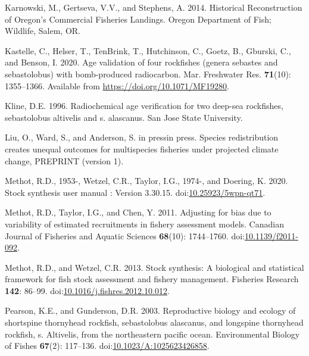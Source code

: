 \documentclass[11pt,
  english,
  letterpaper,
]{article}
\newlength{\cslhangindent}
\newenvironment{CSLReferences}[2] %
 {%
  \setlength{\parindent}{0pt}
  \ifodd #1 \everypar{\setlength{\hangindent}{\cslhangindent}}\ignorespaces\fi
  \ifnum #2 > 0
  \setlength{\parskip}{#2\baselineskip}
  \fi
 }%
 {}
\begin{document}
\begin{CSLReferences}{1}{0}
\leavevmode{}%
Karnowski, M., Gertseva, V.V., and Stephens, A. 2014. Historical {Reconstruction} of {Oregon}'s {Commercial} {Fisheries} {Landings}. Oregon Department of Fish; Wildlife, Salem, OR.

\leavevmode{}%
Kastelle, C., Helser, T., TenBrink, T., Hutchinson, C., Goetz, B., Gburski, C., and Benson, I. 2020. Age validation of four rockfishes (genera sebastes and sebastolobus) with bomb-produced radiocarbon. Mar. Freshwater Res. \textbf{71}(10): 1355--1366. Available from \url{https://doi.org/10.1071/MF19280}.

\leavevmode{}%
Kline, D.E. 1996. Radiochemical age verification for two deep-sea rockfishes, sebastolobus altivelis and s. alascanus. San Jose State University.

\leavevmode{}%
Liu, O., Ward, S., and Anderson, S. in pressin press. Species redistribution creates unequal outcomes for multispecies fisheries under projected climate change, PREPRINT (version 1).

\leavevmode{}%
Methot, R.D., 1953-, Wetzel, C.R., Taylor, I.G., 1974-, and Doering, K. 2020. Stock synthesis user manual : Version 3.30.15. doi:\href{https://doi.org/10.25923/5wpn-qt71}{10.25923/5wpn-qt71}.

\leavevmode{}%
Methot, R.D., Taylor, I.G., and Chen, Y. 2011. Adjusting for bias due to variability of estimated recruitments in fishery assessment models. Canadian Journal of Fisheries and Aquatic Sciences \textbf{68}(10): 1744--1760. doi:\href{https://doi.org/10.1139/f2011-092}{10.1139/f2011-092}.

\leavevmode{}%
Methot, R.D., and Wetzel, C.R. 2013. Stock synthesis: A biological and statistical framework for fish stock assessment and fishery management. Fisheries Research \textbf{142}: 86--99. doi:\href{https://doi.org/10.1016/j.fishres.2012.10.012}{10.1016/j.fishres.2012.10.012}.

\leavevmode{}%
Pearson, K.E., and Gunderson, D.R. 2003. Reproductive biology and ecology of shortspine thornyhead rockfish, sebastolobus alascanus, and longspine thornyhead rockfish, s. Altivelis, from the northeastern pacific ocean. Environmental Biology of Fishes \textbf{67}(2): 117--136. doi:\href{https://doi.org/10.1023/A:1025623426858}{10.1023/A:1025623426858}.


\end{CSLReferences}
\end{document}
